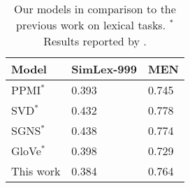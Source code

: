 \begin{table}
\centering
  \begin{tabular}{lll}
    \toprule
    Model           & SimLex-999 & MEN \\
    \midrule
    PPMI$^*$        & 0.393      & 0.745 \\
    SVD$^*$         & 0.432      & 0.778 \\
    SGNS$^*$        & 0.438      & 0.774 \\
    GloVe$^*$       & 0.398      & 0.729 \\
    \addlinespace
    This work       & 0.384      & 0.764 \\
    \bottomrule
  \end{tabular}
  \caption[Comparison with other lexical models]{Our models in comparison to the previous work on lexical tasks. $^*$Results reported by .}
\label{tab:lexical-comparison}
\end{table}
